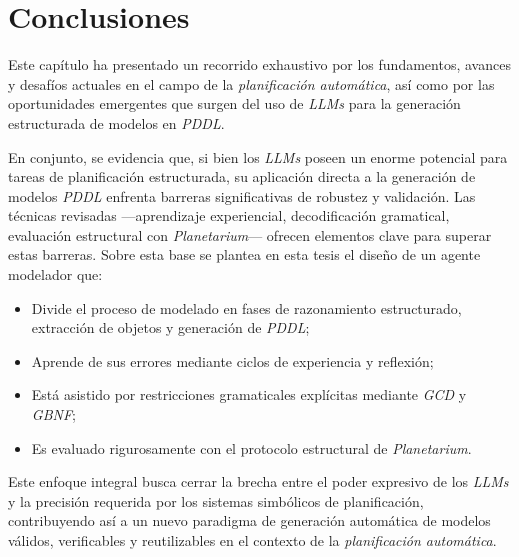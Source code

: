 \section{Conclusiones}

Este capítulo ha presentado un recorrido exhaustivo por los fundamentos, avances y desafíos actuales en el campo de la \textit{planificación automática}, así como por las oportunidades emergentes que surgen del uso de \textit{LLMs} para la generación estructurada de modelos en \textit{PDDL}. 

En conjunto, se evidencia que, si bien los \textit{LLMs} poseen un enorme potencial para tareas de planificación estructurada, su aplicación directa a la generación de modelos \textit{PDDL} enfrenta barreras significativas de robustez y validación. Las técnicas revisadas —aprendizaje experiencial, decodificación gramatical, evaluación estructural con \textit{Planetarium}— ofrecen elementos clave para superar estas barreras. Sobre esta base se plantea en esta tesis el diseño de un agente modelador que:
\begin{itemize}
    \item Divide el proceso de modelado en fases de razonamiento estructurado, extracción de objetos y generación de \textit{PDDL};
    \item Aprende de sus errores mediante ciclos de experiencia y reflexión;
    \item Está asistido por restricciones gramaticales explícitas mediante \textit{GCD} y \textit{GBNF};
    \item Es evaluado rigurosamente con el protocolo estructural de \textit{Planetarium}.
\end{itemize}

Este enfoque integral busca cerrar la brecha entre el poder expresivo de los \textit{LLMs} y la precisión requerida por los sistemas simbólicos de planificación, contribuyendo así a un nuevo paradigma de generación automática de modelos válidos, verificables y reutilizables en el contexto de la \textit{planificación automática}.
